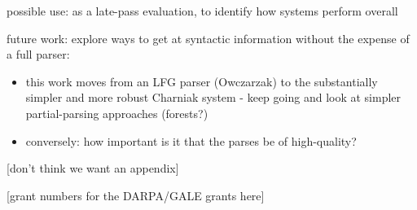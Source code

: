 \documentclass{kluwer}    %
\begin{document}
\begin{article}
possible use: as a late-pass evaluation, to identify how systems
perform overall

future work:  explore ways to get at syntactic information without
the expense of a full parser:
\begin{itemize}
\item this work moves from an LFG parser (Owczarzak) to the
  substantially simpler and more robust Charniak system - keep going
  and look at simpler partial-parsing approaches (forests?)
\item conversely: how important is it that the parses be of
  high-quality?
\end{itemize}





\appendix

[don't think we want an appendix]


\acknowledgements

[grant numbers for the DARPA/GALE grants here]






\end{article}
\end{document}
